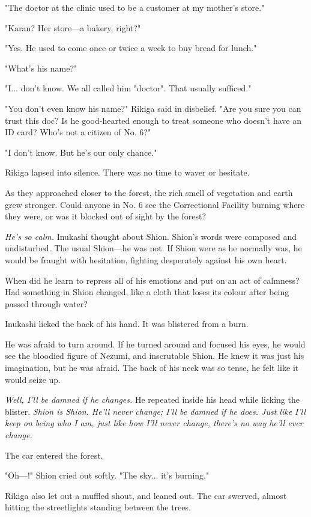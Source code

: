 "The doctor at the clinic used to be a customer at my mother's store."

"Karan? Her store---a bakery, right?"

"Yes. He used to come once or twice a week to buy bread for lunch."

"What's his name?"

"I... don't know. We all called him "doctor". That usually sufficed."

"You don't even know his name?" Rikiga said in disbelief. "Are you sure
you can trust this doc? Is he good-hearted enough to treat someone who
doesn't have an ID card? Who's not a citizen of No. 6?"

"I don't know. But he's our only chance."

Rikiga lapsed into silence. There was no time to waver or hesitate.

As they approached closer to the forest, the rich smell of vegetation
and earth grew stronger. Could anyone in No. 6 see the Correctional
Facility burning where they were, or was it blocked out of sight by the
forest?

\emph{He's so calm.} Inukashi thought about Shion. Shion's words were composed
and undisturbed. The usual Shion---he was not. If Shion were as he
normally was, he would be fraught with hesitation, fighting desperately
against his own heart.

When did he learn to repress all of his emotions and put on an act of
calmness? Had something in Shion changed, like a cloth that loses its
colour after being passed through water?

Inukashi licked the back of his hand. It was blistered from a burn.

He was afraid to turn around. If he turned around and focused his eyes,
he would see the bloodied figure of Nezumi, and inscrutable Shion. He
knew it was just his imagination, but he was afraid. The back of his
neck was so tense, he felt like it would seize up.

\emph{Well, I'll be damned if he changes.} He repeated inside his head while
licking the blister. \emph{Shion is Shion. He'll never change; I'll be damned
if he does. Just like I'll keep on being who I am, just like how I'll
never change, there's no way he'll ever change.}

The car entered the forest.

"Oh---!" Shion cried out softly. "The sky... it's burning."

Rikiga also let out a muffled shout, and leaned out. The car swerved,
almost hitting the streetlights standing between the trees.

